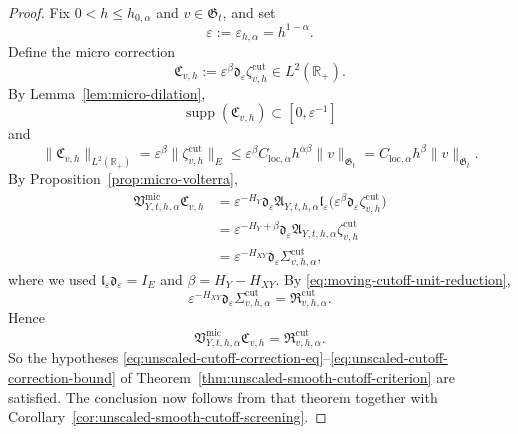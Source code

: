 \documentclass[11pt,a4paper]{amsart}
\theoremstyle{plain}
\theoremstyle{definition}
\theoremstyle{remark}
\newcommand{\R}{\mathbb{R}}
\begin{document}
\begin{proof}
Fix \(0<h\le h_{0,\alpha}\) and \(v\in\mathfrak G_t\), and set
\[
\varepsilon:=\varepsilon_{h,\alpha}=h^{1-\alpha}.
\]
Define the micro correction
\begin{equation}\label{eq:unit-interval-unscaled-micro}
\mathfrak C_{v,h}
:=
\varepsilon^\beta
\mathfrak d_{\varepsilon}\zeta_{v,h}^{\mathrm{cut}}
\in L^2(\R_+).
\end{equation}
By Lemma~\ref{lem:micro-dilation},
\[
\operatorname{supp}(\mathfrak C_{v,h})\subset[0,\varepsilon^{-1}]
\]
and
\[
\|\mathfrak C_{v,h}\|_{L^2(\R_+)}
=
\varepsilon^\beta
\|\zeta_{v,h}^{\mathrm{cut}}\|_E
\le
\varepsilon^\beta C_{\mathrm{loc},\alpha}h^{\alpha\beta}\|v\|_{\mathfrak G_t}
=
C_{\mathrm{loc},\alpha}h^\beta\|v\|_{\mathfrak G_t}.
\]
By Proposition~\ref{prop:micro-volterra},
\begin{align*}
\mathfrak V_{Y,t,h,\alpha}^{\mathrm{mic}}\mathfrak C_{v,h}
&=
\varepsilon^{-H_Y}
\mathfrak d_{\varepsilon}
\mathfrak A_{Y,t,h,\alpha}
\mathfrak l_{\varepsilon}
\bigl(
\varepsilon^\beta \mathfrak d_{\varepsilon}\zeta_{v,h}^{\mathrm{cut}}
\bigr) \\
&=
\varepsilon^{-H_Y+\beta}
\mathfrak d_{\varepsilon}
\mathfrak A_{Y,t,h,\alpha}\zeta_{v,h}^{\mathrm{cut}} \\
&=
\varepsilon^{-H_{XY}}
\mathfrak d_{\varepsilon}
\Sigma_{v,h,\alpha}^{\mathrm{cut}},
\end{align*}
where we used \(\mathfrak l_{\varepsilon}\mathfrak d_{\varepsilon}=I_E\) and
\(\beta=H_Y-H_{XY}\). By \eqref{eq:moving-cutoff-unit-reduction},
\[
\varepsilon^{-H_{XY}}
\mathfrak d_{\varepsilon}
\Sigma_{v,h,\alpha}^{\mathrm{cut}}
=
\mathfrak R_{v,h,\alpha}^{\mathrm{cut}}.
\]
Hence
\[
\mathfrak V_{Y,t,h,\alpha}^{\mathrm{mic}}\mathfrak C_{v,h}
=
\mathfrak R_{v,h,\alpha}^{\mathrm{cut}}.
\]
So the hypotheses \eqref{eq:unscaled-cutoff-correction-eq}--\eqref{eq:unscaled-cutoff-correction-bound}
of Theorem~\ref{thm:unscaled-smooth-cutoff-criterion} are satisfied. The conclusion now follows from
that theorem together with Corollary~\ref{cor:unscaled-smooth-cutoff-screening}.
\end{proof}
\end{document}
